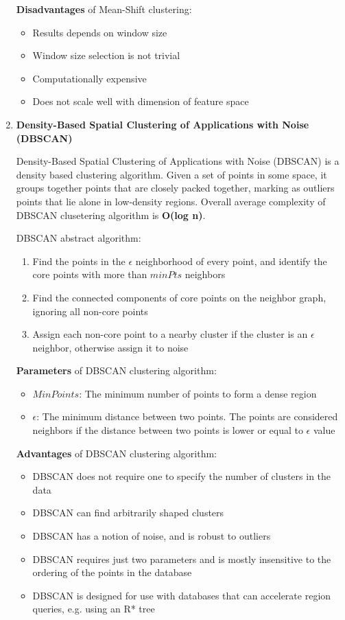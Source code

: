 \begin{enumerate}
    \textbf{Disadvantages} of Mean-Shift clustering:
    \begin{itemize}
        \item Results depends on window size
        \item Window size selection is not trivial
        \item Computationally expensive
        \item Does not scale well with dimension of feature space
    \end{itemize}
    
    \item \textbf{Density-Based Spatial Clustering of Applications with Noise (DBSCAN)}
    
    Density-Based Spatial Clustering of Applications with Noise (DBSCAN) is a density based clustering algorithm. Given a set of points in some space, it groups together points that are closely packed together, marking as outliers points that lie alone in low-density regions. Overall average complexity of DBSCAN clusetering algorithm is \textbf{O(log n)}.
    
    DBSCAN abstract algorithm:
    \begin{enumerate}
        \item Find the points in the $\epsilon$ neighborhood of every point, and identify the core points with more than $minPts$ neighbors
        \item Find the connected components of core points on the neighbor graph, ignoring all non-core points
        \item Assign each non-core point to a nearby cluster if the cluster is an $\epsilon$ neighbor, otherwise assign it to noise
    \end{enumerate}
    
    
    \textbf{Parameters}  of DBSCAN clustering algorithm:
    \begin{itemize}
        \item $MinPoints$: The minimum number of points to form a dense region 
        \item $\epsilon$: The minimum distance between two points. The points are considered neighbors if the distance between two points is lower or equal to $\epsilon$ value
    \end{itemize}
    
    
    \textbf{Advantages} of DBSCAN clustering algorithm:
    \begin{itemize}
        \item DBSCAN does not require one to specify the number of clusters in the data
        \item DBSCAN can find arbitrarily shaped clusters
        \item DBSCAN has a notion of noise, and is robust to outliers
        \item DBSCAN requires just two parameters and is mostly insensitive to the ordering of the points in the database
        \item DBSCAN is designed for use with databases that can accelerate region queries, e.g. using an R* tree
    \end{itemize}
    

\end{enumerate}
